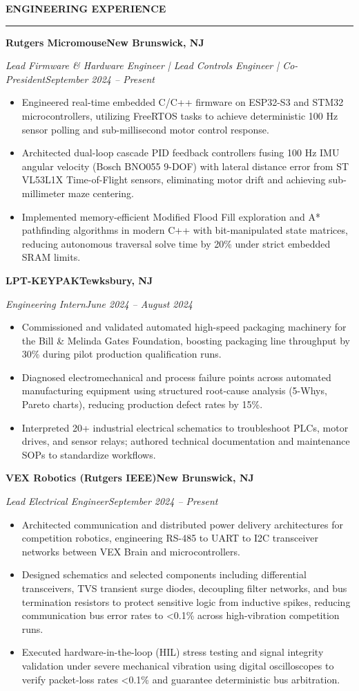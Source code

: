 \documentclass[10pt]{article}
\newcommand{\Section}[1]{%
  \vspace{4.0pt}%
  \textbf{\MakeUppercase{#1}}\par\vspace{-3.5pt}%
  \rule{\linewidth}{0.55pt}\par\vspace{2.5pt}%
}
\newcommand{\Company}[2]{\noindent\textbf{#1}\hfill\textbf{#2}\par}
\newcommand{\RoleDates}[2]{\noindent\textit{#1}\hfill\textit{#2}\par}
\begin{document}
\Section{Engineering Experience}
\Company{Rutgers Micromouse}{New Brunswick, NJ}
\RoleDates{Lead Firmware \& Hardware Engineer | Lead Controls Engineer | Co-President}{September 2024 -- Present}
\begin{itemize}
  \item Engineered real-time embedded C/C++ firmware on ESP32-S3 and STM32 microcontrollers, utilizing FreeRTOS tasks to achieve deterministic 100 Hz sensor polling and sub-millisecond motor control response.
  \item Architected dual-loop cascade PID feedback controllers fusing 100 Hz IMU angular velocity (Bosch BNO055 9-DOF) with lateral distance error from ST VL53L1X Time-of-Flight sensors, eliminating motor drift and achieving sub-millimeter maze centering.
  \item Implemented memory-efficient Modified Flood Fill exploration and A* pathfinding algorithms in modern C++ with bit-manipulated state matrices, reducing autonomous traversal solve time by 20\% under strict embedded SRAM limits.
\end{itemize}
\vspace{2pt}
\Company{LPT-KEYPAK}{Tewksbury, NJ}
\RoleDates{Engineering Intern}{June 2024 -- August 2024}
\begin{itemize}
  \item Commissioned and validated automated high-speed packaging machinery for the Bill \& Melinda Gates Foundation, boosting packaging line throughput by 30\% during pilot production qualification runs.
  \item Diagnosed electromechanical and process failure points across automated manufacturing equipment using structured root-cause analysis (5-Whys, Pareto charts), reducing production defect rates by 15\%.
  \item Interpreted 20+ industrial electrical schematics to troubleshoot PLCs, motor drives, and sensor relays; authored technical documentation and maintenance SOPs to standardize workflows.
\end{itemize}
\vspace{2pt}
\Company{VEX Robotics (Rutgers IEEE)}{New Brunswick, NJ}
\RoleDates{Lead Electrical Engineer}{September 2024 -- Present}
\begin{itemize}
  \item Architected communication and distributed power delivery architectures for competition robotics, engineering RS-485 to UART to I2C transceiver networks between VEX Brain and microcontrollers.
  \item Designed schematics and selected components including differential transceivers, TVS transient surge diodes, decoupling filter networks, and bus termination resistors to protect sensitive logic from inductive spikes, reducing communication bus error rates to <0.1\% across high-vibration competition runs.
  \item Executed hardware-in-the-loop (HIL) stress testing and signal integrity validation under severe mechanical vibration using digital oscilloscopes to verify packet-loss rates <0.1\% and guarantee deterministic bus arbitration.
\end{itemize}
\end{document}
